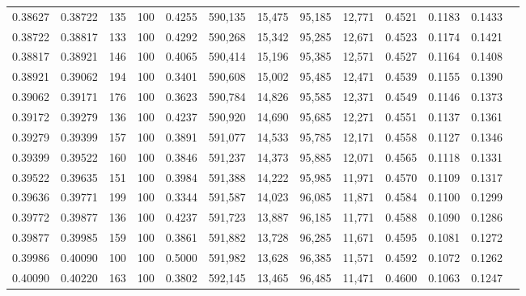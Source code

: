 \begin{tabular}{rrrrrrrrrrrrr}
0.38627 & 0.38722 &   135 & 100 &                                     0.4255 & 590,135 &  15,475 &  95,185 &  12,771 & 0.4521 & 0.1183 & 0.1433 \\
0.38722 & 0.38817 &   133 & 100 &                                     0.4292 & 590,268 &  15,342 &  95,285 &  12,671 & 0.4523 & 0.1174 & 0.1421 \\
0.38817 & 0.38921 &   146 & 100 &                                     0.4065 & 590,414 &  15,196 &  95,385 &  12,571 & 0.4527 & 0.1164 & 0.1408 \\
0.38921 & 0.39062 &   194 & 100 &                                     0.3401 & 590,608 &  15,002 &  95,485 &  12,471 & 0.4539 & 0.1155 & 0.1390 \\
0.39062 & 0.39171 &   176 & 100 &                                     0.3623 & 590,784 &  14,826 &  95,585 &  12,371 & 0.4549 & 0.1146 & 0.1373 \\
0.39172 & 0.39279 &   136 & 100 &                                     0.4237 & 590,920 &  14,690 &  95,685 &  12,271 & 0.4551 & 0.1137 & 0.1361 \\
0.39279 & 0.39399 &   157 & 100 &                                     0.3891 & 591,077 &  14,533 &  95,785 &  12,171 & 0.4558 & 0.1127 & 0.1346 \\
0.39399 & 0.39522 &   160 & 100 &                                     0.3846 & 591,237 &  14,373 &  95,885 &  12,071 & 0.4565 & 0.1118 & 0.1331 \\
0.39522 & 0.39635 &   151 & 100 &                                     0.3984 & 591,388 &  14,222 &  95,985 &  11,971 & 0.4570 & 0.1109 & 0.1317 \\
0.39636 & 0.39771 &   199 & 100 &                                     0.3344 & 591,587 &  14,023 &  96,085 &  11,871 & 0.4584 & 0.1100 & 0.1299 \\
0.39772 & 0.39877 &   136 & 100 &                                     0.4237 & 591,723 &  13,887 &  96,185 &  11,771 & 0.4588 & 0.1090 & 0.1286 \\
0.39877 & 0.39985 &   159 & 100 &                                     0.3861 & 591,882 &  13,728 &  96,285 &  11,671 & 0.4595 & 0.1081 & 0.1272 \\
0.39986 & 0.40090 &   100 & 100 &                                     0.5000 & 591,982 &  13,628 &  96,385 &  11,571 & 0.4592 & 0.1072 & 0.1262 \\
0.40090 & 0.40220 &   163 & 100 &                                     0.3802 & 592,145 &  13,465 &  96,485 &  11,471 & 0.4600 & 0.1063 & 0.1247 \\

\end{tabular}
